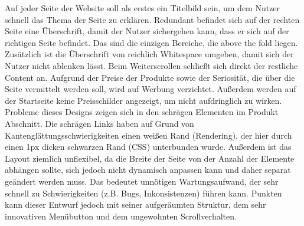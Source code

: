 Auf jeder Seite der Website soll als erstes ein Titelbild sein, um dem Nutzer schnell das Thema der Seite zu erklären. Redundant befindet sich auf der rechten Seite eine Überschrift, damit der Nutzer sichergehen kann, dass er sich auf der richtigen Seite befindet. Das sind die einzigen Bereiche, die above the fold liegen. Zusätzlich ist die Überschrift von reichlich Whitespace umgeben, damit sich der Nutzer nicht ablenken lässt. Beim Weiterscrollen schließt sich direkt der restliche Content an.
Aufgrund der Preise der Produkte sowie der Seriosität, die über die Seite vermittelt werden soll, wird auf Werbung verzichtet. Außerdem werden auf der Startseite keine Preisschilder angezeigt, um nicht aufdringlich zu wirken.
\label{inno_probs}
Probleme dieses Designs zeigen sich in den schrägen Elementen im Produkt Abschnitt. Die schrägen Links haben auf Grund von Kantenglättungsschwierigkeiten einen weißen Rand (Rendering), der hier durch einen 1px dicken schwarzen Rand (CSS) unterbunden wurde. Außerdem ist das Layout ziemlich unflexibel, da die Breite der Seite von der Anzahl der Elemente abhängen sollte, sich jedoch nicht dynamisch anpassen kann und daher separat geändert werden muss. Das bedeutet unnötigen Wartungsaufwand, der sehr schnell zu Schwierigkeiten (z.B. Bugs, Inkonsistenzen) führen kann.
Punkten kann dieser Entwurf jedoch mit seiner aufgeräumten Struktur, dem sehr innovativen Menübutton und dem ungewohnten Scrollverhalten.
